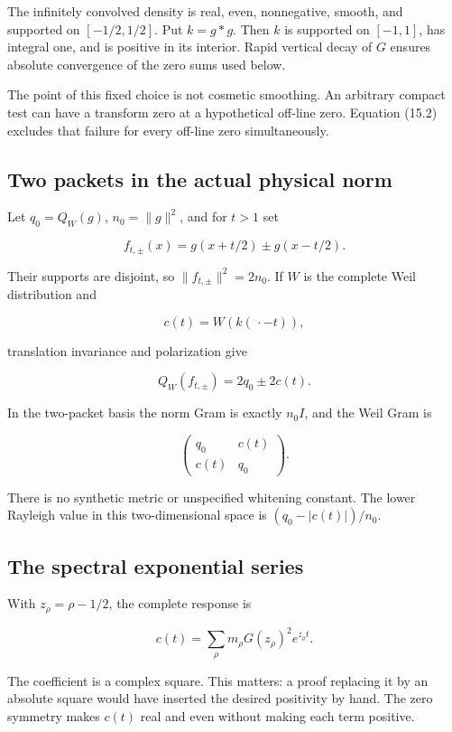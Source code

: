 \documentclass[
  10pt,
  a4paper,
  10pt,
  oneside,
  openany]{book}
\begin{document}
The infinitely convolved density is real, even, nonnegative, smooth, and
supported on \([-1/2,1/2]\). Put \(k=g*g\). Then \(k\) is supported on
\([-1,1]\), has integral one, and is positive in its interior. Rapid
vertical decay of \(G\) ensures absolute convergence of the zero sums
used below.

The point of this fixed choice is not cosmetic smoothing. An arbitrary
compact test can have a transform zero at a hypothetical off-line zero.
Equation (15.2) excludes that failure for every off-line zero
simultaneously.

\subsection{Two packets in the actual physical
norm}\label{two-packets-in-the-actual-physical-norm}

Let \(q_0=Q_W(g)\), \(n_0=\|g\|^2\), and for \(t>1\) set

\[
f_{t,\pm}(x)=g(x+t/2)\pm g(x-t/2).
\tag{15.3}\label{eq:15.3}
\]

Their supports are disjoint, so \(\|f_{t,\pm}\|^2=2n_0\). If \(W\) is
the complete Weil distribution and

\[
c(t)=W(k(\,\cdot-t)),
\tag{15.4}\label{eq:15.4}
\]

translation invariance and polarization give

\[
Q_W(f_{t,\pm})=2q_0\pm2c(t).
\tag{15.5}\label{eq:15.5}
\]

In the two-packet basis the norm Gram is exactly \(n_0I\), and the Weil
Gram is

\[
\begin{pmatrix}q_0&c(t)\\c(t)&q_0\end{pmatrix}.
\tag{15.6}\label{eq:15.6}
\]

There is no synthetic metric or unspecified whitening constant. The
lower Rayleigh value in this two-dimensional space is
\((q_0-|c(t)|)/n_0\).

\subsection{The spectral exponential
series}\label{the-spectral-exponential-series}

With \(z_\rho=\rho-1/2\), the complete response is

\[
c(t)=\sum_\rho m_\rho G(z_\rho)^2e^{z_\rho t}.
\tag{15.7}\label{eq:15.7}
\]

The coefficient is a complex square. This matters: a proof replacing it
by an absolute square would have inserted the desired positivity by
hand. The zero symmetry makes \(c(t)\) real and even without making each
term positive.
\end{document}
